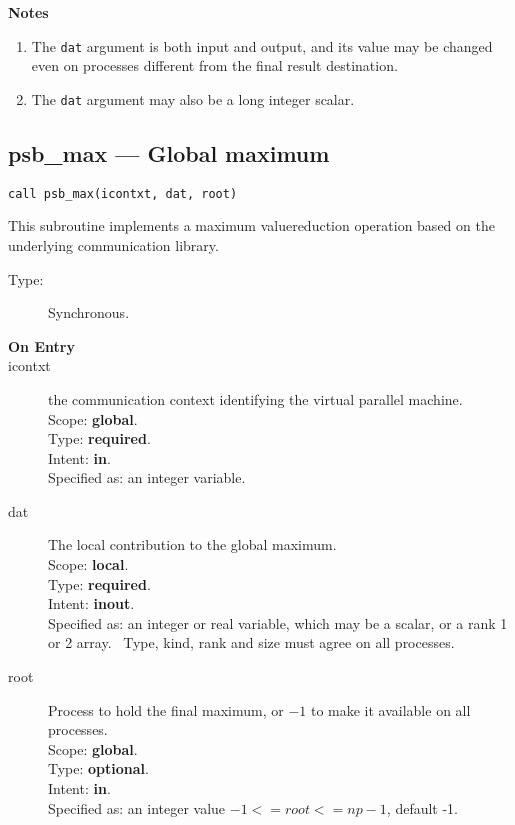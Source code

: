 {\par\noindent\large\bfseries Notes}
\begin{enumerate}
\item The \verb|dat| argument is both input and output, and its
  value may be changed even on processes different from the final
  result destination.
\item The \verb|dat| argument may also be a long integer scalar.
\end{enumerate}



\clearpage\subsection*{psb\_max --- Global maximum}

\begin{verbatim}
call psb_max(icontxt, dat, root)
\end{verbatim}

This subroutine implements a maximum valuereduction
operation based on the underlying communication library. 
\begin{description}
\item[Type:] Synchronous.
\item[\bf  On Entry ]
\item[icontxt] the communication context identifying the virtual
  parallel machine.\\
Scope: {\bf global}.\\
Type: {\bf required}.\\
Intent: {\bf in}.\\
Specified as: an integer variable.
\item[dat] The local contribution to the global maximum.\\
Scope: {\bf local}.\\
Type: {\bf required}.\\
Intent: {\bf inout}.\\
Specified as: an integer or  real variable, which may be a
scalar, or a rank 1 or 2 array. \
Type, kind, rank and size must agree on all processes.
\item[root] Process to hold the final maximum, or $-1$ to make it available
  on all processes.\\
Scope: {\bf global}.\\
Type: {\bf optional}.\\
Intent: {\bf in}.\\
Specified as: an integer value $-1<= root <= np-1$, default -1. \\
\end{description}


